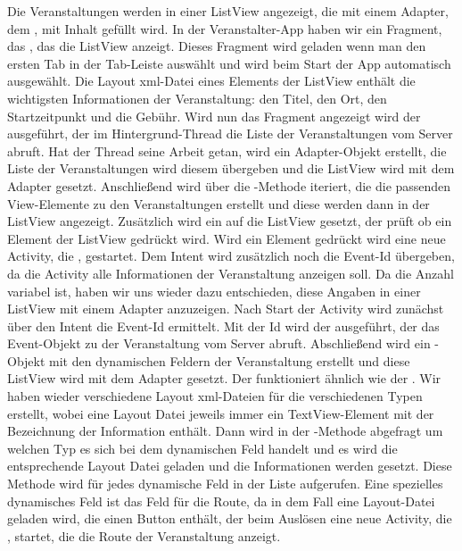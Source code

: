 Die Veranstaltungen werden in einer ListView angezeigt, die mit einem Adapter, dem , mit Inhalt gefüllt wird. In der Veranstalter-App haben wir ein Fragment, das , das die ListView anzeigt. Dieses Fragment wird geladen wenn man den ersten Tab in der Tab-Leiste auswählt und wird beim Start der App automatisch ausgewählt. Die Layout xml-Datei eines Elements der ListView enthält die wichtigsten Informationen der Veranstaltung: den Titel, den Ort, den Startzeitpunkt und die Gebühr. Wird nun das Fragment angezeigt wird der  ausgeführt, der im Hintergrund-Thread die Liste der Veranstaltungen vom Server abruft. Hat der Thread seine Arbeit getan, wird ein Adapter-Objekt erstellt, die Liste der Veranstaltungen wird diesem übergeben und die ListView wird mit dem Adapter gesetzt. Anschließend wird über die -Methode iteriert, die die passenden View-Elemente zu den Veranstaltungen erstellt und diese werden dann in der ListView angezeigt. Zusätzlich wird ein  auf die ListView gesetzt, der prüft ob ein Element der ListView gedrückt wird. Wird ein Element gedrückt wird eine neue Activity, die , gestartet. Dem Intent wird zusätzlich noch die Event-Id übergeben, da die Activity alle Informationen der Veranstaltung anzeigen soll. Da die Anzahl variabel ist, haben wir uns wieder dazu entschieden, diese Angaben in einer ListView mit einem Adapter anzuzeigen. Nach Start der Activity wird zunächst über den Intent die Event-Id ermittelt. Mit der Id wird der  ausgeführt, der das Event-Objekt zu der Veranstaltung vom Server abruft. Abschließend wird ein -Objekt mit den dynamischen Feldern der Veranstaltung erstellt und diese ListView wird mit dem Adapter gesetzt. Der  funktioniert ähnlich wie der . Wir haben wieder verschiedene Layout xml-Dateien für die verschiedenen Typen erstellt, wobei eine Layout Datei jeweils immer ein TextView-Element mit der Bezeichnung der Information enthält. Dann wird in der -Methode abgefragt um welchen Typ es sich bei dem dynamischen Feld handelt und es wird die entsprechende Layout Datei geladen und die Informationen werden gesetzt. Diese Methode wird für jedes dynamische Feld in der Liste aufgerufen. Eine spezielles dynamisches Feld ist das Feld für die Route, da in dem Fall eine Layout-Datei geladen wird, die einen Button enthält, der beim Auslösen eine neue Activity, die , startet, die die Route der Veranstaltung anzeigt. \\

